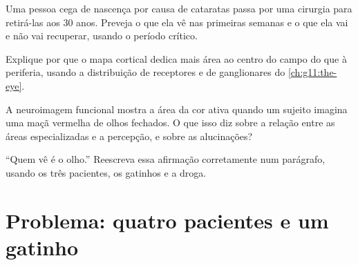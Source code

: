 \begin{exercise}[$\star\star\star$]\label{exo:g11:vision-and-brain:12}
Uma pessoa cega de nascença por causa de cataratas passa por uma
cirurgia para retirá-las aos 30 anos. Preveja o que ela vê nas
primeiras semanas e o que ela vai e não vai recuperar, usando o
período crítico.
\end{exercise}

\begin{exercise}[$\star\star\star$]\label{exo:g11:vision-and-brain:13}
Explique por que o mapa cortical dedica mais área ao centro do campo do
que à periferia, usando a distribuição de receptores e de 
ganglionares do \cref{ch:g11:the-eye}.
\end{exercise}

\begin{exercise}[$\star\star\star$]\label{exo:g11:vision-and-brain:14}
A neuroimagem funcional mostra a área da cor ativa quando um sujeito
imagina uma maçã vermelha de olhos fechados. O que isso diz sobre a
relação entre as áreas especializadas e a percepção, e sobre as
alucinações?
\end{exercise}

\begin{exercise}[$\star\star\star$]\label{exo:g11:vision-and-brain:15}
``Quem vê é o olho.'' Reescreva essa afirmação corretamente num
parágrafo, usando os três pacientes, os gatinhos e a droga.
\end{exercise}

\section{Problema: quatro pacientes e um gatinho}

